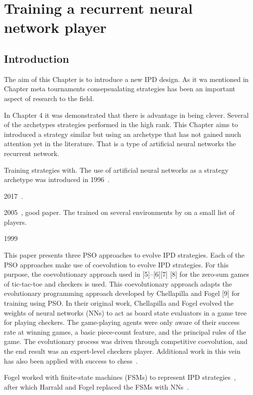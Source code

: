\chapter{Training a recurrent neural network player}\label{chapter:lstm}

\section{Introduction}

The aim of this Chapter is to introduce a new IPD design. As it wa mentioned
in Chapter meta tournaments consepsualating strategies has been an important
aspect of research to the field.

In Chapter 4 it was demonstrated that there is advantage in being clever.
Several of the archetypes strategies performed in the high rank. This
Chapter aims to introduced a strategy similar but using an archetype that
has not gained much attention yet in the literature. That is a type of artificial
neural networks the recurrent network.

Training strategies with.
The use of artificial neural networks as a strategy archetype was introduced
in 1996~\cite{Harrald1996}.

2017~\cite{Harper2017}.


2005~\cite{Franken2005}, good paper. The trained on several environments by on
a small list of players.

1999~\cite{Chellapilla1999}

This paper presents three PSO approaches to evolve IPD strategies. Each of the
PSO approaches make use of coevolution to evolve IPD strategies. For this
purpose, the coevolutionary approach used in [5]–[6][7] [8] for the zero-sum
games of tic-tac-toe and checkers is used. This coevolutionary approach adapts
the evolutionary programming approach developed by Chellapilla and Fogel [9] for
training using PSO. In their original work, Chellapilla and Fogel evolved the
weights of neural networks (NNs) to act as board state evaluators in a game tree
for playing checkers. The game-playing agents were only aware of their success
rate at winning games, a basic piece-count feature, and the principal rules of
the game. The evolutionary process was driven through competitive coevolution,
and the end result was an expert-level checkers player. Additional work in this
vein has also been applied with success to chess~\cite{Harrald1996}.

Fogel worked with finite-state machines (FSMs) to represent IPD strategies~\cite{Fogel1993},
after which Harrald and Fogel replaced the FSMs with NNs~\cite{Harrald1996}.

